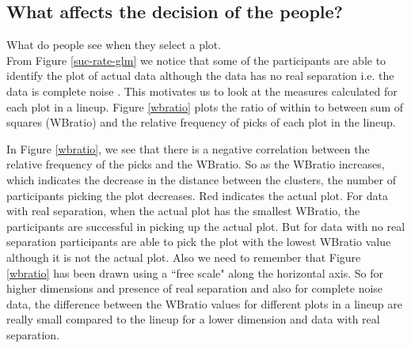 \documentclass[12]{article}
\begin{document}

\subsection{What affects the decision of the people?}

\normalsize
{\color{red} What do people see when they select a plot.} \\

From Figure \ref{suc-rate-glm} we notice that some of the participants are able to identify the plot of actual data  although the data has no real separation i.e. the data is complete noise . This motivates us to look at the measures calculated for each plot in a lineup. Figure \ref{wbratio} plots the ratio of within to between sum of squares (WBratio) and the relative frequency of picks of each plot in the lineup.

In Figure \ref{wbratio}, we see that there is a negative correlation between the relative frequency of the picks and the WBratio. So as the WBratio increases, which indicates the decrease in the distance between the clusters,  the number of participants picking the plot decreases. Red indicates the actual plot. For data with real separation, when the actual plot has the smallest WBratio, the participants are successful in picking up the actual plot. But for data with no real separation participants are able to pick the plot with the lowest WBratio value although it is not the actual plot. Also we need to remember that Figure \ref{wbratio} has been drawn using a ``free scale" along the horizontal axis. So for higher dimensions and presence of real separation and also for complete noise data, the difference between the WBratio values for different plots in a lineup are really small compared to the lineup for a lower dimension and data with real separation.  
\end{document}

